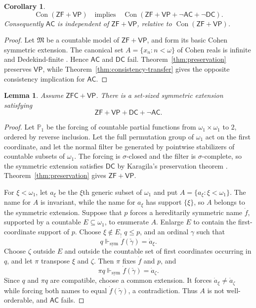 \documentclass[11pt,a4paper]{amsart}
\newcommand{\VP}{\mathsf{VP}}
\newcommand{\AC}{\mathsf{AC}}
\newcommand{\ZF}{\mathsf{ZF}}
\newcommand{\ZFC}{\mathsf{ZFC}}
\newcommand{\Con}{\operatorname{Con}}
\newcommand{\forcesS}{\Vdash_{\mathrm{sym}}}
\newcommand{\DC}{\mathsf{DC}}
\theoremstyle{plain}
\newtheorem{lemma}[theorem]{Lemma}
\newtheorem{corollary}[theorem]{Corollary}
\theoremstyle{definition}
\theoremstyle{remark}
\begin{document}
\begin{corollary}\label{cor:choice}
\[
\Con(\ZF+\VP)\quad\text{implies}\quad
\Con(\ZF+\VP+\neg\AC+\neg\DC).
\]
Consequently $\AC$ is independent of $\ZF+\VP$, relative to $\Con(\ZF+\VP)$.
\end{corollary}

\begin{proof}
Let $\mathfrak M$ be a countable model of $\ZF+\VP$, and form its basic Cohen symmetric extension.  The canonical set $A=\{x_n:n<\omega\}$ of Cohen reals is infinite and Dedekind-finite \cite[Section~5.3]{Jech}.  Hence $\AC$ and $\DC$ fail.  Theorem~\ref{thm:preservation} preserves $\VP$, while Theorem~\ref{thm:consistency-transfer} gives the opposite consistency implication for $\AC$.
\end{proof}

\begingroup

\begin{lemma}\label{lem:omega1-Cohen}
Assume $\ZFC+\VP$.  There is a set-sized symmetric extension satisfying
\[
\ZF+\VP+\DC+\neg\AC.
\]
\end{lemma}

\begin{proof}
Let $\mathbb P_1$ be the forcing of countable partial functions from $\omega_1\times\omega_1$ to $2$, ordered by reverse inclusion.  Let the full permutation group of $\omega_1$ act on the first coordinate, and let the normal filter be generated by pointwise stabilizers of countable subsets of $\omega_1$.  The forcing is $\sigma$-closed and the filter is $\sigma$-complete, so the symmetric extension satisfies $\DC$ by Karagila's preservation theorem \cite[Lemma~3.1]{KaragilaDC}.  Theorem~\ref{thm:preservation} gives $\ZF+\VP$.

For $\xi<\omega_1$, let $a_\xi$ be the $\xi$th generic subset of $\omega_1$ and put $A=\{a_\xi:\xi<\omega_1\}$.  The name for $A$ is invariant, while the name for $a_\xi$ has support $\{\xi\}$, so $A$ belongs to the symmetric extension.  Suppose that $p$ forces a hereditarily symmetric name $\dot f$, supported by a countable $E\subseteq\omega_1$, to enumerate $A$.  Enlarge $E$ to contain the first-coordinate support of $p$.  Choose $\xi\notin E$, $q\leq p$, and an ordinal $\gamma$ such that
\[
q\forcesS\dot f(\check\gamma)=\dot a_\xi.
\]
Choose $\zeta$ outside $E$ and outside the countable set of first coordinates occurring in $q$, and let $\pi$ transpose $\xi$ and $\zeta$.  Then $\pi$ fixes $\dot f$ and $p$, and
\[
\pi q\forcesS\dot f(\check\gamma)=\dot a_\zeta.
\]
Since $q$ and $\pi q$ are compatible, choose a common extension.  It forces $\dot a_\xi\neq\dot a_\zeta$ while forcing both names to equal $\dot f(\check\gamma)$, a contradiction.  Thus $A$ is not well-orderable, and $\AC$ fails.
\end{proof}
\end{document}
